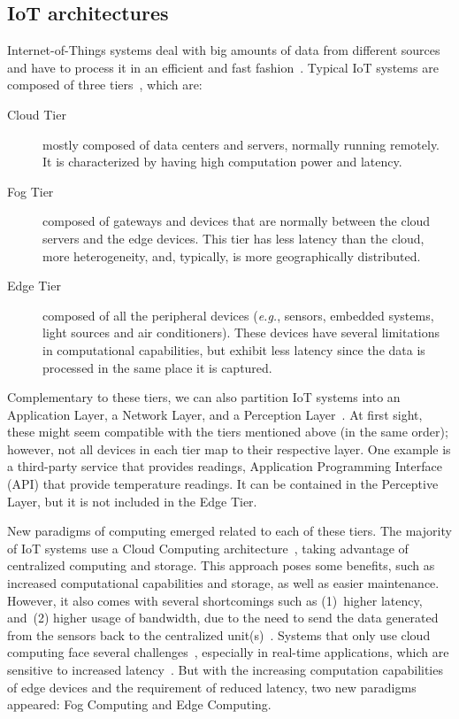 \subsection{IoT architectures}\label{sec:architectures}

Internet-of-Things systems deal with big amounts of data from different sources and have to process it in an efficient and fast fashion~\cite{lin_survey}. Typical IoT systems are composed of three tiers~\cite{Yang2019}, which are:

\begin{description}
    \item[Cloud Tier] mostly composed of data centers and servers, normally running remotely. It is characterized by having high computation power and latency.
    \item[Fog Tier] composed of gateways and devices that are normally between the cloud servers and the edge devices. This tier has less latency than the cloud, more heterogeneity, and, typically, is more geographically distributed.
    \item[Edge Tier] composed of all the peripheral devices (\emph{e.g.}, sensors, embedded systems, light sources and air conditioners). These devices have several limitations in computational capabilities, but exhibit less latency since the data is processed in the same place it is captured.
\end{description}

Complementary to these tiers, we can also partition IoT systems into an Application Layer, a Network Layer, and a Perception Layer~\cite{iot_layers}. At first sight, these might seem compatible with the tiers mentioned above (in the same order); however, not all devices in each tier map to their respective layer. One example is a third-party service that provides readings, \eg Application Programming Interface (API) that provide temperature readings. It can be contained in the Perceptive Layer, but it is not included in the Edge Tier.

New paradigms of computing emerged related to each of these tiers. The majority of IoT systems use a Cloud Computing architecture~\cite{cisco}, taking advantage of centralized computing and storage. This approach poses some benefits, such as increased computational capabilities and storage, as well as easier maintenance. However, it also comes with several shortcomings such as (1)~higher latency, and~(2) higher usage of bandwidth, due to the need to send the data generated from the sensors back to the centralized unit(s)~\cite{connecting_fog_and_cloud}. Systems that only use cloud computing face several challenges~\cite{aazam2014cloud}, especially in real-time applications, which are sensitive to increased latency~\cite{latency_critical}. But with the increasing computation capabilities of edge devices and the requirement of reduced latency, two new paradigms appeared: Fog Computing and Edge Computing.

